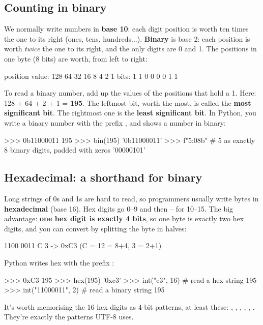 \documentclass[10pt,a4paper]{article}
\begin{document}
\subsection{Counting in binary}
We normally write numbers in \textbf{base 10}: each digit position is worth ten times the one to its right (ones, tens, hundreds...). \textbf{Binary} is base 2: each position is worth \emph{twice} the one to its right, and the only digits are 0 and 1.
The positions in one byte (8 bits) are worth, from left to right:
\begin{txtcode}
position value:  128  64  32  16   8   4   2   1
bits:              1   1   0   0   0   0   1   1
\end{txtcode}
To read a binary number, add up the values of the positions that hold a 1. Here: 128 + 64 + 2 + 1 = \textbf{195}. The leftmost bit, worth the most, is called the \textbf{most significant bit}. The rightmost one is the \textbf{least significant bit}.
In Python, you write a binary number with the prefix , and  shows a number in binary:
\begin{txtcode}
>>> 0b11000011
195
>>> bin(195)
'0b11000011'
>>> f"{5:08b}"         # 5 as exactly 8 binary digits, padded with zeros
'00000101'
\end{txtcode}
\subsection{Hexadecimal: a shorthand for binary}
Long strings of 0s and 1s are hard to read, so programmers usually write bytes in \textbf{hexadecimal} (base 16). Hex digits go 0–9 and then – for 10–15. The big advantage: \textbf{one hex digit is exactly 4 bits}, so one byte is exactly two hex digits, and you can convert by splitting the byte in halves:
\begin{txtcode}
1100 0011
   C    3      ->  0xC3   (C = 12 = 8+4,  3 = 2+1)
\end{txtcode}
Python writes hex with the prefix :
\begin{txtcode}
>>> 0xC3
195
>>> hex(195)
'0xc3'
>>> int("c3", 16)      # read a hex string
195
>>> int("11000011", 2) # read a binary string
195
\end{txtcode}
It’s worth memorising the 16 hex digits as 4-bit patterns, at least these: , , , , , . They’re exactly the patterns UTF-8 uses.
\setcounter{section}{1}
\end{document}
